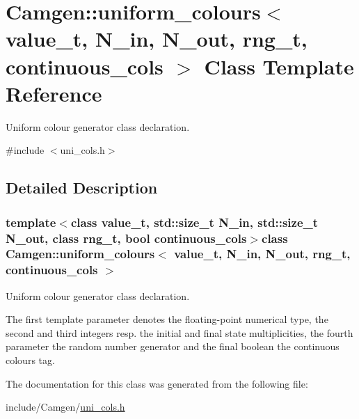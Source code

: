 \hypertarget{a00543}{\section{Camgen\-:\-:uniform\-\_\-colours$<$ value\-\_\-t, N\-\_\-in, N\-\_\-out, rng\-\_\-t, continuous\-\_\-cols $>$ Class Template Reference}
\label{a00543}
}


Uniform colour generator class declaration.  




{\ttfamily \#include $<$uni\-\_\-cols.\-h$>$}



\subsection{Detailed Description}
\subsubsection*{template$<$class value\-\_\-t, std\-::size\-\_\-t N\-\_\-in, std\-::size\-\_\-t N\-\_\-out, class rng\-\_\-t, bool continuous\-\_\-cols$>$class Camgen\-::uniform\-\_\-colours$<$ value\-\_\-t, N\-\_\-in, N\-\_\-out, rng\-\_\-t, continuous\-\_\-cols $>$}

Uniform colour generator class declaration. 

The first template parameter denotes the floating-\/point numerical type, the second and third integers resp. the initial and final state multiplicities, the fourth parameter the random number generator and the final boolean the continuous colours tag. 

The documentation for this class was generated from the following file\-:\begin{DoxyCompactItemize}
\item 
include/\-Camgen/\hyperlink{a00794}{uni\-\_\-cols.\-h}\end{DoxyCompactItemize}
